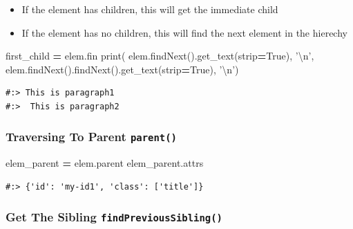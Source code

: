 \documentclass[
]{book}
\newenvironment{Shaded}{\begin{snugshade}}{\end{snugshade}}
\newcommand{\BuiltInTok}[1]{#1}
\newcommand{\CharTok}[1]{\textcolor[rgb]{0.5,0.5,0.5}{#1}}
\newcommand{\NormalTok}[1]{#1}
\newcommand{\OperatorTok}[1]{\textcolor[rgb]{0.43,0.43,0.43}{\textbf{#1}}}
\newcommand{\StringTok}[1]{\textcolor[rgb]{0.5,0.5,0.5}{#1}}
\newcommand{\VariableTok}[1]{\textcolor[rgb]{0,0,0}{#1}}
\providecommand{\tightlist}{%
  \setlength{\itemsep}{0pt}\setlength{\parskip}{0pt}}
\begin{document}
\begin{itemize}
\tightlist
\item
  If the element has children, this will get the immediate child\\
\item
  If the element has no children, this will find the next element in the hierechy
\end{itemize}

\begin{Shaded}
\begin{Highlighting}[]
\NormalTok{first_child }\OperatorTok{=}\NormalTok{ elem.fin}
\BuiltInTok{print}\NormalTok{( }
\NormalTok{elem.findNext().get_text(strip}\OperatorTok{=}\VariableTok{True}\NormalTok{), }\StringTok{'}\CharTok{\textbackslash{}n}\StringTok{'}\NormalTok{, }
\NormalTok{elem.findNext().findNext().get_text(strip}\OperatorTok{=}\VariableTok{True}\NormalTok{), }\StringTok{'}\CharTok{\textbackslash{}n}\StringTok{'}\NormalTok{)}
\end{Highlighting}
\end{Shaded}

\begin{verbatim}
#:> This is paragraph1 
#:>  This is paragraph2
\end{verbatim}

\hypertarget{traversing-to-parent-parent}{%
\subsubsection{\texorpdfstring{Traversing To Parent \texttt{parent()}}{Traversing To Parent parent()}}\label{traversing-to-parent-parent}}

\begin{Shaded}
\begin{Highlighting}[]
\NormalTok{elem_parent }\OperatorTok{=}\NormalTok{ elem.parent}
\NormalTok{elem_parent.attrs}
\end{Highlighting}
\end{Shaded}

\begin{verbatim}
#:> {'id': 'my-id1', 'class': ['title']}
\end{verbatim}

\hypertarget{get-the-sibling-findprevioussibling}{%
\subsubsection{\texorpdfstring{Get The Sibling \texttt{findPreviousSibling()}}{Get The Sibling findPreviousSibling()}}\label{get-the-sibling-findprevioussibling}}
\end{document}
